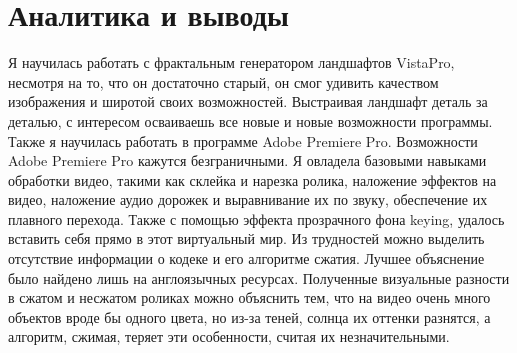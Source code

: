 \section{Аналитика и выводы}

Я научилась работать с фрактальным генератором ландшафтов VistaPro, несмотря на то, что он достаточно старый, он смог удивить качеством изображения и широтой своих возможностей. Выстраивая ландшафт деталь за деталью, с интересом осваиваешь все новые и новые возможности программы. Также я научилась работать в программе Adobe Premiere Pro. Возможности Adobe Premiere Pro кажутся безграничными. Я овладела базовыми навыками обработки видео, такими как склейка и нарезка ролика, наложение эффектов на видео, наложение аудио дорожек и выравнивание их по звуку, обеспечение их плавного перехода. Также с помощью эффекта прозрачного фона keying, удалось вставить себя прямо в этот виртуальный мир. Из трудностей можно выделить отсутствие информации о кодеке и его алгоритме сжатия. Лучшее объяснение было найдено лишь на англоязычных ресурсах.
Полученные визуальные разности в сжатом и несжатом роликах  можно объяснить тем, что на видео очень много объектов вроде бы одного цвета, но из-за теней, солнца их оттенки разнятся, а алгоритм, сжимая, теряет эти особенности, считая их незначительными.

\pagebreak

